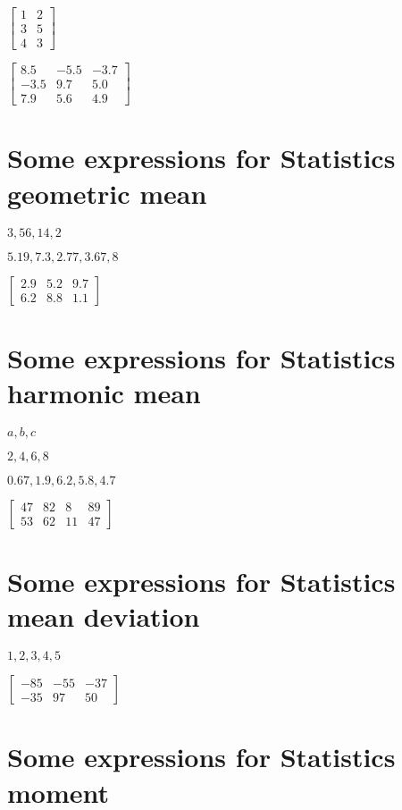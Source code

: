 \documentclass{article}
\begin{document}
$\left[ 
\begin{array}{cc}
1 & 2 \\ 
3 & 5 \\ 
4 & 3%
\end{array}%
\right] $

$\left[ 
\begin{array}{rrr}
8.5 & -5.5 & -3.7 \\ 
-3.5 & 9.7 & 5.0 \\ 
7.9 & 5.6 & 4.9%
\end{array}%
\right] $

\section{Some expressions for Statistics geometric mean}

$3,56,14,2$

$5.19,7.3,2.77,3.67,8$

$\left[ 
\begin{array}{ccc}
2.9 & 5.2 & 9.7 \\ 
6.2 & 8.8 & 1.1%
\end{array}%
\right] \allowbreak $

\section{Some expressions for Statistics harmonic mean}

$a,b,c$

$2,4,6,8$

$0.67,1.9,6.2,5.8,4.7$

$\left[ 
\begin{array}{cccc}
47 & 82 & 8 & 89 \\ 
53 & 62 & 11 & 47%
\end{array}%
\right] $

\section{Some expressions for Statistics mean deviation}

$1,2,3,4,5$

$\left[ 
\begin{array}{ccc}
-85 & -55 & -37 \\ 
-35 & 97 & 50%
\end{array}%
\right] $

\section{Some expressions for Statistics moment}
\end{document}
